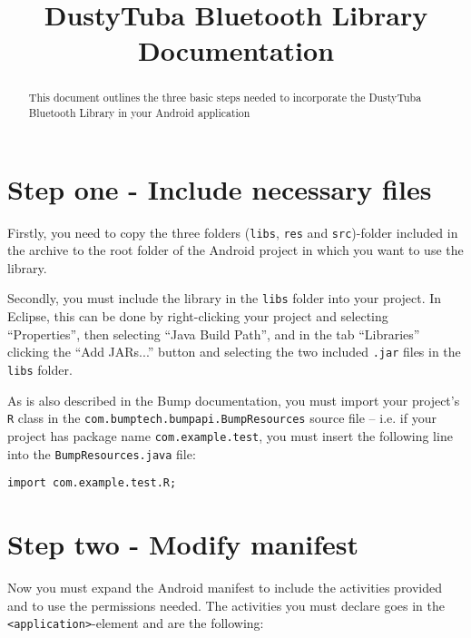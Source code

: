 \documentclass[a4paper,11pt]{article}
\title{DustyTuba Bluetooth Library Documentation}
\begin{document}
\maketitle

\begin{abstract}
This document outlines the three basic steps needed to incorporate the DustyTuba Bluetooth Library in your Android application
\end{abstract}




\section{Step one - Include necessary files}
Firstly, you need to copy the three folders (\verb+libs+, \verb+res+ and \verb+src+)-folder included in the archive to the root folder of the Android project in which you want to use the library.

Secondly, you must include the library in the \verb+libs+ folder into your project. In Eclipse, this can be done by right-clicking your project and selecting ``Properties'', then selecting ``Java Build Path'', and in the tab ``Libraries'' clicking the ``Add JARs...'' button and selecting the two included {\tt .jar} files in the \verb+libs+ folder.

As is also described in the Bump\texttrademark{} documentation, you must import your project's \verb+R+ class in the {\tt com.bumptech.bumpapi.BumpResources} source file -- i.e. if your project has package name {\tt com.example.test}, you must insert the following line into the {\tt BumpResources.java} file:

\begin{verbatim}
import com.example.test.R;
\end{verbatim}

\clearpage


\section{Step two - Modify manifest}
Now you must expand the Android manifest to include the activities provided and to use the permissions needed. The activities you must declare goes in the \verb+<application>+-element and are the following:
\end{document}
